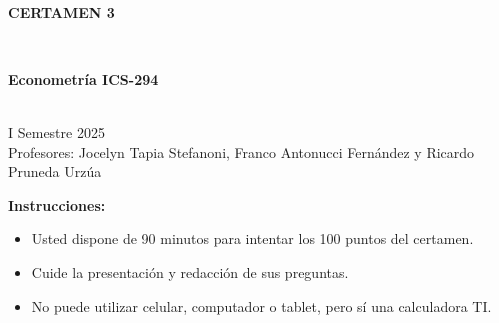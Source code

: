 \documentclass[10pt,a4paper]{article}
\begin{document}
\vspace{5cm}



\begin{center}
\begin{large}
\textbf{\\CERTAMEN 3}
\end{large}\\
\end{center}

\begin{center}
\begin{large}
\textbf{Econometría ICS-294}
\end{large}\\
\vspace{0.2cm}
I Semestre 2025\\
Profesores: Jocelyn Tapia Stefanoni, Franco Antonucci Fernández y Ricardo Pruneda Urz\'ua\\
\end{center}

\textbf{Instrucciones:} 

\begin{itemize}

    \item Usted dispone de 90 minutos  para intentar los 100 puntos del certamen.
    \item Cuide la presentación y redacción de sus preguntas.
    \item No puede utilizar celular, computador o tablet, pero sí una calculadora TI.
     
\end{itemize}
\end{document}
